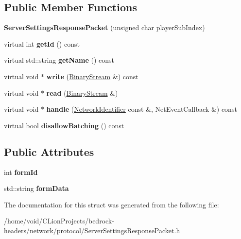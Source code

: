 \subsection*{Public Member Functions}
\begin{DoxyCompactItemize}
\item 
\mbox{\label{struct_server_settings_response_packet_a8e1067452f46440d8f846bbd796a1e6d}} 
{\bfseries Server\+Settings\+Response\+Packet} (unsigned char player\+Sub\+Index)
\item 
\mbox{\label{struct_server_settings_response_packet_a54a1afb58faff39c4bf092aaa0bbe6a2}} 
virtual int {\bfseries get\+Id} () const
\item 
\mbox{\label{struct_server_settings_response_packet_aca932cc2423d13bc55da096da28ab812}} 
virtual std\+::string {\bfseries get\+Name} () const
\item 
\mbox{\label{struct_server_settings_response_packet_a581911dbebc8ab34b6d1c6e3a7d69233}} 
virtual void $\ast$ {\bfseries write} (\mbox{\hyperlink{struct_binary_stream}{Binary\+Stream}} \&) const
\item 
\mbox{\label{struct_server_settings_response_packet_a80226ee347193217eeede74e1c73442a}} 
virtual void $\ast$ {\bfseries read} (\mbox{\hyperlink{struct_binary_stream}{Binary\+Stream}} \&)
\item 
\mbox{\label{struct_server_settings_response_packet_a60960b3b232f98b41a9796e6c6054d83}} 
virtual void $\ast$ {\bfseries handle} (\mbox{\hyperlink{struct_network_identifier}{Network\+Identifier}} const \&, Net\+Event\+Callback \&) const
\item 
\mbox{\label{struct_server_settings_response_packet_a3291faab260ae94184e9af0e2ae309cf}} 
virtual bool {\bfseries disallow\+Batching} () const
\end{DoxyCompactItemize}
\subsection*{Public Attributes}
\begin{DoxyCompactItemize}
\item 
\mbox{\label{struct_server_settings_response_packet_a0467791f59bfd33bbb712cedf61e5ab1}} 
int {\bfseries form\+Id}
\item 
\mbox{\label{struct_server_settings_response_packet_ac0c6683d0658e31886892a2595b5a1ff}} 
std\+::string {\bfseries form\+Data}
\end{DoxyCompactItemize}


The documentation for this struct was generated from the following file\+:\begin{DoxyCompactItemize}
\item 
/home/void/\+C\+Lion\+Projects/bedrock-\/headers/network/protocol/Server\+Settings\+Response\+Packet.\+h\end{DoxyCompactItemize}
